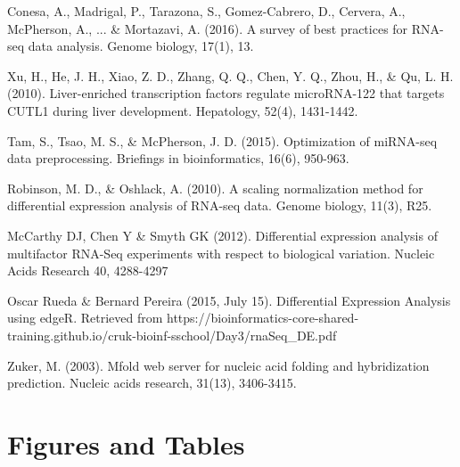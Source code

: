 \documentclass{bioinfo}
\begin{document}
\begin{thebibliography}{}

Conesa, A., Madrigal, P., Tarazona, S., Gomez-Cabrero, D., Cervera, A., McPherson, A., ... \& Mortazavi, A. (2016). A survey of best practices for RNA-seq data analysis. Genome biology, 17(1), 13.

Xu, H., He, J. H., Xiao, Z. D., Zhang, Q. Q., Chen, Y. Q., Zhou, H., \& Qu, L. H. (2010). Liver-enriched transcription factors regulate microRNA-122 that targets CUTL1 during liver development. Hepatology, 52(4), 1431-1442.

 Tam, S., Tsao, M. S., \& McPherson, J. D. (2015). Optimization of miRNA-seq data preprocessing. Briefings in bioinformatics, 16(6), 950-963.

Robinson, M. D., \& Oshlack, A. (2010). A scaling normalization method for differential expression analysis of RNA-seq data. Genome biology, 11(3), R25.

McCarthy DJ, Chen Y \& Smyth GK (2012). Differential expression analysis of multifactor RNA-Seq experiments with respect to biological variation. Nucleic Acids Research 40, 4288-4297

Oscar Rueda \& Bernard Pereira (2015, July 15). Differential Expression Analysis using edgeR. Retrieved from https://bioinformatics-core-shared-training.github.io/cruk-bioinf-sschool/Day3/rnaSeq\_DE.pdf

Zuker, M. (2003). Mfold web server for nucleic acid folding and hybridization prediction. Nucleic acids research, 31(13), 3406-3415.


\end{thebibliography}


\section{Figures and Tables}
\onecolumn
\end{document}
